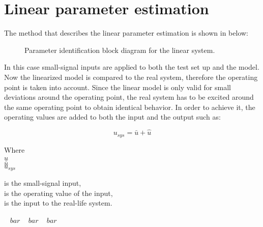 \section{Linear parameter estimation} 
\label{LinParamEst}


The method that describes the linear parameter estimation is shown in  below:

\begin{figure}[H]
\centering
 
\caption{Parameter identification block diagram for the linear system. }
\label{fig:parame_block_lin}
\end{figure}

In this case small-signal inputs are applied to both the test set up and the model.  Now the linearized model is compared to the real system, therefore the operating point is taken into account. Since the linear model is only valid for small deviations around the operating point, the real system has to be excited around the same operating point to obtain identical behavior. In order to achieve it, the operating values are added to both the input and the output such as: 

\begin{equation}
u_{sys} = \bar{u} + \hat{u}
 \label{u_smallsignal}
\end{equation}

\begin{minipage}[t]{0.20\textwidth}
Where\\
\hspace*{8mm} $\hat{u}$ \\
\hspace*{8mm} $\bar{u}$ \\
\hspace*{8mm} $u_{sys}$ 
\end{minipage}
\begin{minipage}[t]{0.68\textwidth}
\vspace*{2mm}
is the small-signal input, \\
is the operating value of the input,\\
is the input to the real-life system. 
\end{minipage}
\begin{minipage}[t]{0.10\textwidth}
\vspace*{2mm}
\textcolor{White}{te}$\unit{bar}$
\textcolor{White}{te}$\unit{bar}$
\textcolor{White}{te}$\unit{bar}$
\end{minipage} 

